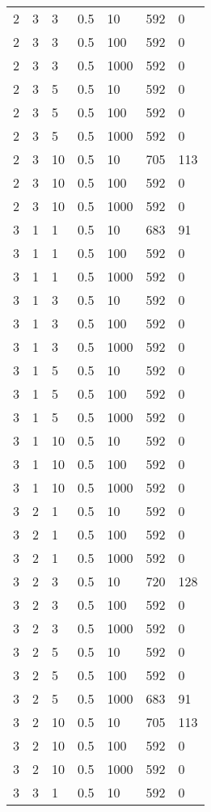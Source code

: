 \begin{longtable}{ | l | l | l | l | l | l | l |}
	2 & 3 & 3 & 0.5 & 10 & 592 & 0 \\ 
	2 & 3 & 3 & 0.5 & 100 & 592 & 0 \\ 
	2 & 3 & 3 & 0.5 & 1000 & 592 & 0 \\ 
	2 & 3 & 5 & 0.5 & 10 & 592 & 0 \\ 
	2 & 3 & 5 & 0.5 & 100 & 592 & 0 \\ 
	2 & 3 & 5 & 0.5 & 1000 & 592 & 0 \\ 
	2 & 3 & 10 & 0.5 & 10 & 705 & 113 \\ 
	2 & 3 & 10 & 0.5 & 100 & 592 & 0 \\ 
	2 & 3 & 10 & 0.5 & 1000 & 592 & 0 \\ 
	3 & 1 & 1 & 0.5 & 10 & 683 & 91 \\ 
	3 & 1 & 1 & 0.5 & 100 & 592 & 0 \\ 
	3 & 1 & 1 & 0.5 & 1000 & 592 & 0 \\ 
	3 & 1 & 3 & 0.5 & 10 & 592 & 0 \\ 
	3 & 1 & 3 & 0.5 & 100 & 592 & 0 \\ 
	3 & 1 & 3 & 0.5 & 1000 & 592 & 0 \\ 
	3 & 1 & 5 & 0.5 & 10 & 592 & 0 \\ 
	3 & 1 & 5 & 0.5 & 100 & 592 & 0 \\ 
	3 & 1 & 5 & 0.5 & 1000 & 592 & 0 \\ 
	3 & 1 & 10 & 0.5 & 10 & 592 & 0 \\ 
	3 & 1 & 10 & 0.5 & 100 & 592 & 0 \\ 
	3 & 1 & 10 & 0.5 & 1000 & 592 & 0 \\ 
	3 & 2 & 1 & 0.5 & 10 & 592 & 0 \\ 
	3 & 2 & 1 & 0.5 & 100 & 592 & 0 \\ 
	3 & 2 & 1 & 0.5 & 1000 & 592 & 0 \\ 
	3 & 2 & 3 & 0.5 & 10 & 720 & 128 \\ 
	3 & 2 & 3 & 0.5 & 100 & 592 & 0 \\ 
	3 & 2 & 3 & 0.5 & 1000 & 592 & 0 \\ 
	3 & 2 & 5 & 0.5 & 10 & 592 & 0 \\ 
	3 & 2 & 5 & 0.5 & 100 & 592 & 0 \\ 
	3 & 2 & 5 & 0.5 & 1000 & 683 & 91 \\ 
	3 & 2 & 10 & 0.5 & 10 & 705 & 113 \\ 
	3 & 2 & 10 & 0.5 & 100 & 592 & 0 \\ 
	3 & 2 & 10 & 0.5 & 1000 & 592 & 0 \\ 
	3 & 3 & 1 & 0.5 & 10 & 592 & 0 \\ 

\end{longtable}
